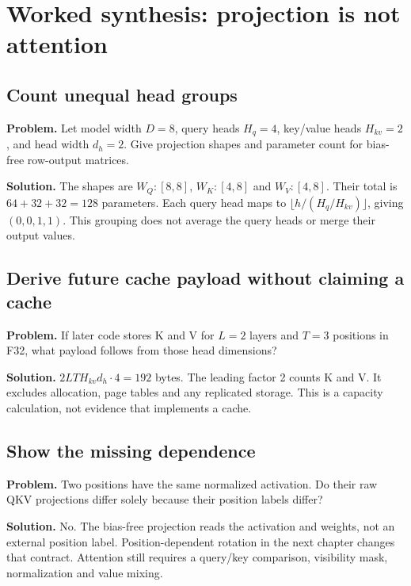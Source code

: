\clearpage
\section{Worked synthesis: projection is not attention}
\subsection{Count unequal head groups}
\textbf{Problem.} Let model width $D=8$, query heads $H_q=4$, key/value heads
$H_{kv}=2$, and head width $d_h=2$. Give projection shapes and parameter count
for bias-free row-output matrices.

\textbf{Solution.} The shapes are $W_Q:[8,8]$, $W_K:[4,8]$ and $W_V:[4,8]$.
Their total is $64+32+32=128$ parameters. Each query head maps to
$\lfloor h/(H_q/H_{kv})\rfloor$, giving $(0,0,1,1)$.
This grouping does not average the query heads or merge their output values.

\subsection{Derive future cache payload without claiming a cache}
\textbf{Problem.} If later code stores K and V for $L=2$ layers and $T=3$
positions in F32, what payload follows from those head dimensions?

\textbf{Solution.} $2LTH_{kv}d_h\cdot4=192$ bytes. The leading factor 2 counts
K and V. It excludes allocation, page tables and any replicated storage.
This is a capacity calculation, not evidence that  implements a cache.

\subsection{Show the missing dependence}
\textbf{Problem.} Two positions have the same normalized activation. Do their
raw QKV projections differ solely because their position labels differ?

\textbf{Solution.} No. The bias-free projection reads the activation and
weights, not an external position label. Position-dependent rotation in the
next chapter changes that contract. Attention still requires a query/key
comparison, visibility mask, normalization and value mixing.

